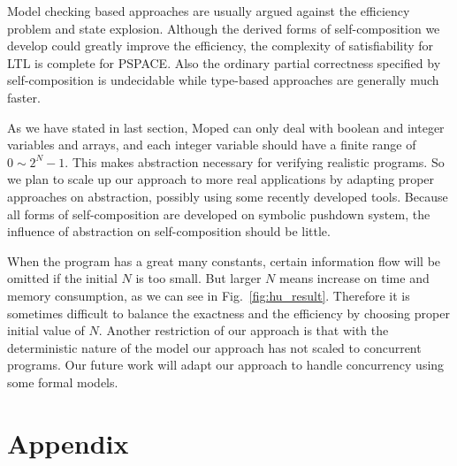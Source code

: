 \documentclass{llncs}
\begin{document}
Model checking based approaches are usually argued against the
efficiency problem and state explosion. Although the derived forms
of self-composition we develop could greatly improve the efficiency,
the complexity of satisfiability for LTL is complete for
PSPACE\cite{DBLP:journals/jacm/SistlaC85}\cite{DBLP:conf/banff/Vardi95}.
Also the ordinary partial correctness specified by self-composition
is undecidable while type-based approaches are generally much
faster.

As we have stated in last section, Moped can only deal with boolean
and integer variables and arrays, and each integer variable should
have a finite range of $0\sim 2^N-1$. This makes abstraction
necessary for verifying realistic programs. So we plan to scale up
our approach to more real applications by adapting proper approaches
on abstraction, possibly using some recently developed
tools\cite{DBLP:conf/tacas/SuwimonteerabuthSE05}\cite{DBLP:conf/cav/SuwimonteerabuthBSE07}.
Because all forms of self-composition are developed on symbolic
pushdown system, the influence of abstraction on self-composition
should be little.

When the program has a great many constants, certain information
flow will be omitted if the initial $N$ is too small. But larger $N$
means increase on time and memory consumption, as we can see in
Fig.~\ref{fig:hu_result}. Therefore it is sometimes difficult to
balance the exactness and the efficiency by choosing proper initial
value of $N$. Another restriction of our approach is that with the
deterministic nature of the model our approach has not scaled to
concurrent programs. Our future work will adapt our approach to
handle concurrency using some formal
models\cite{DBLP:conf/popl/BouajjaniET03}\cite{DBLP:conf/fsttcs/BouajjaniESS05}.

\nocite{mcps:mcbook}



\section*{Appendix}
\end{document}
